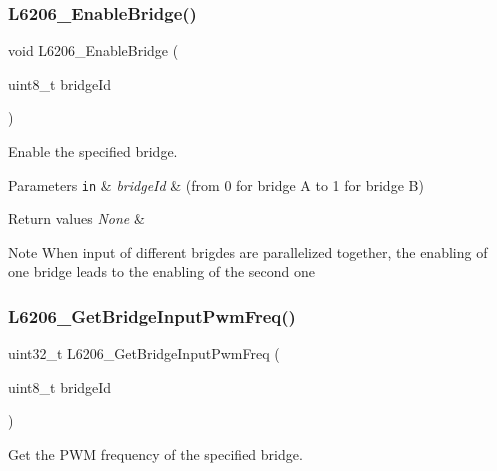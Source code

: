 \subsubsection{\texorpdfstring{L6206\+\_\+\+Enable\+Bridge()}{L6206\_EnableBridge()}}
{\footnotesize\ttfamily void L6206\+\_\+\+Enable\+Bridge (\begin{DoxyParamCaption}\item[{uint8\+\_\+t}]{bridge\+Id }\end{DoxyParamCaption})}



Enable the specified bridge. 


\begin{DoxyParams}[1]{Parameters}
\mbox{\tt in}  & {\em bridge\+Id} & (from 0 for bridge A to 1 for bridge B) \\
\hline
\end{DoxyParams}

\begin{DoxyRetVals}{Return values}
{\em None} & \\
\hline
\end{DoxyRetVals}
\begin{DoxyNote}{Note}
When input of different brigdes are parallelized together, the enabling of one bridge leads to the enabling of the second one 
\end{DoxyNote}
\mbox{\label{group___l6206___exported___functions_ga96e17386e67b53504b3a175c6407552a}} 
\subsubsection{\texorpdfstring{L6206\+\_\+\+Get\+Bridge\+Input\+Pwm\+Freq()}{L6206\_GetBridgeInputPwmFreq()}}
{\footnotesize\ttfamily uint32\+\_\+t L6206\+\_\+\+Get\+Bridge\+Input\+Pwm\+Freq (\begin{DoxyParamCaption}\item[{uint8\+\_\+t}]{bridge\+Id }\end{DoxyParamCaption})}



Get the P\+WM frequency of the specified bridge. 


